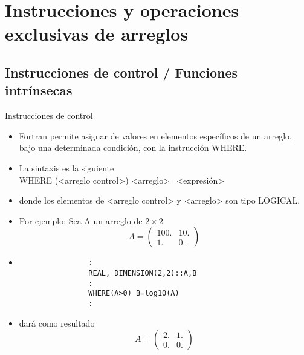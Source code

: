 
\section{Instrucciones y operaciones exclusivas de arreglos}  


\subsection{Instrucciones de control / Funciones intrínsecas}


\begin{frame}[fragile]{Instrucciones de control} 
    \begin{itemize}[<+(0)->]
        \item Fortran permite asignar de valores en elementos específicos de un arreglo, bajo una determinada condición, con la instrucción WHERE. 
        \item La sintaxis es la siguiente \\
            \centering WHERE (<arreglo control>) <arreglo>=<expresión> 
        \item [] donde los elementos de <arreglo control> y <arreglo> son tipo LOGICAL.
        \item [] Por ejemplo: Sea A un arreglo de $2 \times 2$ 
            $$
                A = \left( \begin{array}{cc}
                    100. & 10. \\
                    1. & 0. \end{array} \right)
            $$
        \item [] 
            \begin{verbatim}
                :
                REAL, DIMENSION(2,2)::A,B
                :
                WHERE(A>0) B=log10(A)
                : 
            \end{verbatim}
        \item [] dará como resultado
            $$
                A = \left( \begin{array}{cc}
                    2. & 1. \\
                    0. & 0. \end{array} \right)
            $$
    \end{itemize}
\end{frame}



